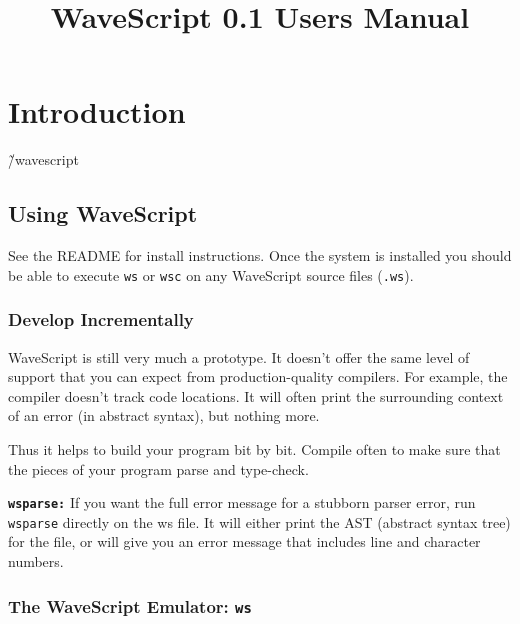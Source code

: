 


\title{WaveScript 0.1 Users Manual}



\maketitle


\tableofcontents
\clearpage

\chapter{Introduction}

\~/wavescript

\section{Using WaveScript}

See the README for install instructions.  Once the system is installed
you should be able to execute {\tt ws} or {\tt wsc} on any WaveScript
source files ({\tt .ws}).

\subsection*{Develop Incrementally}

WaveScript is still very much a prototype.  It doesn't offer the same
level of support that you can expect from production-quality
compilers.  For example, the compiler doesn't track code locations.
It will often print the surrounding context of an error (in abstract
syntax), but nothing more.

Thus it helps to build your program bit by bit.  Compile often to make
sure that the pieces of your program parse and type-check.

{\tt \bf wsparse:}
If you want the full error message for a stubborn parser error, run
{\tt wsparse} directly on the ws file.  It will either print the AST
(abstract syntax tree) for the file, or will give you an error message
that includes line and character numbers.

\subsection{The WaveScript Emulator: {\tt \bf ws} }

